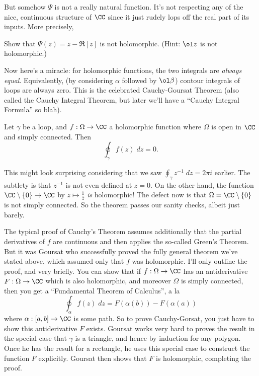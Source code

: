 But somehow $\Psi$ is not a really natural function.
It's not respecting any of the nice, continuous structure of $\CC$ since
it just rudely lops off the real part of its inputs.
More precisely,
\begin{ques}
	Show that $\Psi(z) = z - \Re[z]$ is not holomorphic.
	(Hint: $\ol z$ is not holomorphic.)
\end{ques}

Now here's a miracle: for holomorphic functions, the two integrals are \emph{always equal}.
Equivalently, (by considering $\alpha$ followed by $\ol\beta$) contour integrals of loops are always zero.
This is the celebrated Cauchy-Goursat Theorem
(also called the Cauchy Integral Theorem,
but later we'll have a ``Cauchy Integral Formula'' so blah).

\begin{theorem}
	Let $\gamma$ be a loop, and $f : \Omega \to \CC$ a holomorphic function
	where $\Omega$ is open in $\CC$ and simply connected.
	Then
	\[ \oint_\gamma f(z) \; dz = 0. \]
\end{theorem}
\begin{remark}
	This might look surprising considering that we saw $\oint_\gamma z^{-1} \; dz = 2 \pi i$ earlier.
	The subtlety is that $z^{-1}$ is not even defined at $z = 0$.
	On the other hand, the function $\CC \setminus \{0\} \to \CC$ by $z \mapsto \frac 1z$ \emph{is} holomorphic!
	The defect now is that $\Omega = \CC \setminus \{0\}$ is not simply connected.
	So the theorem passes our sanity checks, albeit just barely.
\end{remark}

The typical proof of Cauchy's Theorem assumes additionally
that the partial derivatives of $f$ are continuous
and then applies the so-called Green's Theorem.
But it was Goursat who successfully proved the fully general theorem we've stated above,
which assumed only that $f$ was holomorphic.
I'll only outline the proof, and very briefly.
You can show that if $f : \Omega \to \CC$ has an antiderivative $F : \Omega \to \CC$ which is also holomorphic,
and moreover $\Omega$ is simply connected, then you get a ``Fundamental Theorem of Calculus'', a la
\[ \oint_\alpha f(z) \; dz = F(\alpha(b)) - F(\alpha(a)) \]
where $\alpha : [a,b] \to \CC$ is some path.
So to prove Cauchy-Gorsat, you just have to show this antiderivative $F$ exists.
Goursat works very hard to proves the result in the special case that $\gamma$ is a triangle,
and hence by induction for any polygon.
Once he has the result for a rectangle, he uses this special case to construct the function $F$ explicitly.
Goursat then shows that $F$ is holomorphic, completing the proof.

